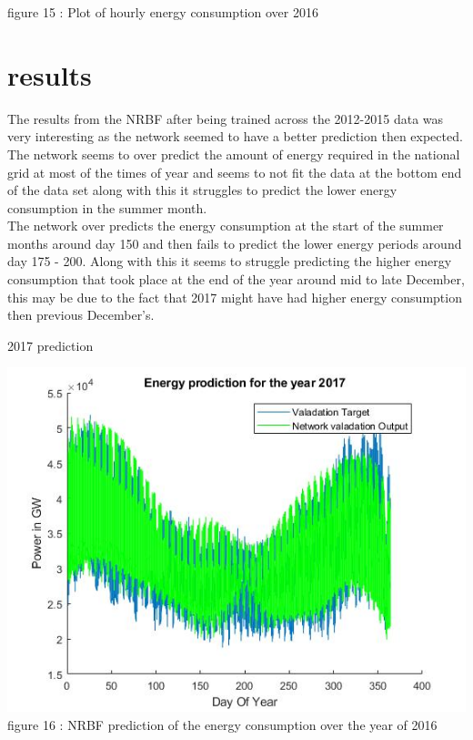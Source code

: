 \documentclass{IEEEtran}[11pt]
\begin{document}
\begin{flushleft}
  \vspace{1.5mm}
  {\footnotesize figure 15 : Plot of hourly energy consumption over 2016}
  \\
  \vspace{1.5mm}

\end{flushleft}
\section{results}
\begin{flushleft}
  The results from the NRBF after being trained across the 2012-2015 data was
  very interesting as the network seemed to have a better prediction then expected.
  The network seems to over predict the amount of energy required in the national
  grid at most of the times of year and seems to not fit the data at the bottom
  end of the data set along with this it struggles to predict the  lower energy
  consumption in the summer month.
  \\
  \vspace{1.5mm}
  The network over predicts the energy consumption
  at the start of the summer months around day 150 and then fails to predict the
  lower energy periods around day 175 - 200. Along with this it seems to struggle
  predicting the higher energy consumption that took place at the end of the year
  around mid to late December, this may be due to the fact that 2017 might have
  had higher energy consumption then previous December's.
  \vspace{1.5mm}
  \begin{center}
    2017 prediction
  \end{center}
  \vspace{1.5mm}
  \includegraphics[scale = 0.45]{2017prediction.jpg}
  \vspace{1.5mm}
  {\footnotesize figure 16 : NRBF prediction of the energy consumption over the
  year of 2016 }
  \\
  \vspace{1.5mm}


\end{flushleft}
\end{document}
